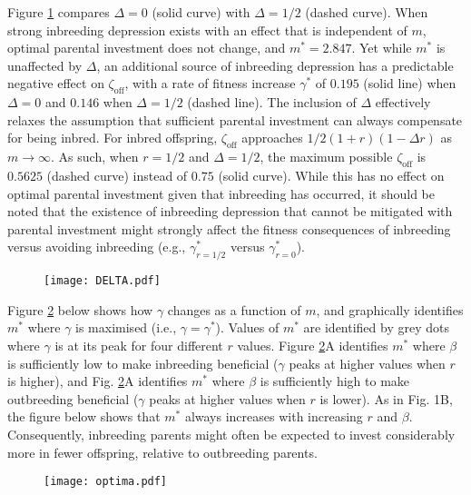 \documentclass[12pt]{article}
\begin{document}
Figure \ref{DELTA} compares $\Delta=0$ (solid curve) with $\Delta=1/2$ (dashed curve). When strong inbreeding depression exists with an effect that is independent of $m$, optimal parental investment does not change, and $m^{*}=2.847$. Yet while $m^{*}$ is unaffected by $\Delta$, an additional source of inbreeding depression has a predictable negative effect on $\zeta_{\textrm{off}}$, with a rate of fitness increase $\gamma^{*}$ of $0.195$ (solid line) when $\Delta=0$ and $0.146$ when $\Delta=1/2$ (dashed line). The inclusion of $\Delta$ effectively relaxes the assumption that sufficient parental investment can always compensate for being inbred. For inbred offspring, $\zeta_{\textrm{off}}$ approaches $1/2(1+r)(1 - \Delta r)$ as $m \to \infty$. As such, when $r=1/2$ and $\Delta=1/2$, the maximum possible $\zeta_{\textrm{off}}$ is $0.5625$ (dashed curve) instead of $0.75$ (solid curve). While this has no effect on optimal parental investment given that inbreeding has occurred, it should be noted that the existence of inbreeding depression that cannot be mitigated with parental investment might strongly affect the fitness consequences of inbreeding versus avoiding inbreeding (e.g., $\gamma^{*}_{r=1/2}$ versus $\gamma^{*}_{r=0}$).

\begin{figure}
\begin{center}				
\texttt{[image: DELTA.pdf]}
\end{center}
\label{DELTA}
\end{figure}

\clearpage

\noindent Figure \ref{optima} below shows how $\gamma$ changes as a function of $m$, and graphically identifies $m^{*}$ where $\gamma$ is maximised (i.e., $\gamma = \gamma^{*}$). Values of $m^{*}$ are identified by grey dots where $\gamma$ is at its peak for four different $r$ values. Figure \ref{optima}A identifies $m^{*}$ where $\beta$ is sufficiently low to make inbreeding beneficial ($\gamma$ peaks at higher values when $r$ is higher), and Fig. \ref{optima}A identifies $m^{*}$ where $\beta$ is sufficiently high to make outbreeding beneficial ($\gamma$ peaks at higher values when $r$ is lower). As in Fig. 1B, the figure below shows that $m^{*}$ always increases with increasing $r$ and $\beta$. Consequently, inbreeding parents might often be expected to invest considerably more in fewer offspring, relative to outbreeding parents.

\begin{figure}[H]
\begin{center}				
\texttt{[image: optima.pdf]}
\end{center}
\label{optima}
\end{figure}
\end{document}
